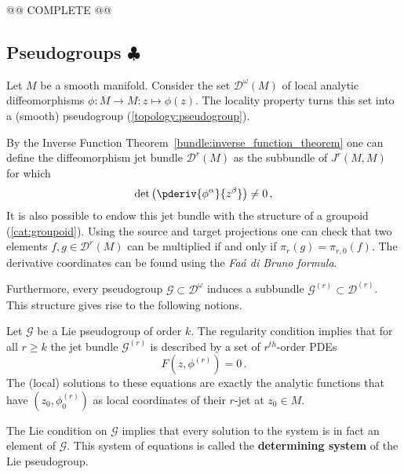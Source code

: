     @@ COMPLETE @@

\subsection{\texorpdfstring{Pseudogroups $\clubsuit$}{Pseudogroups}}

    \begin{example}
        Let $M$ be a smooth manifold. Consider the set $\mathcal{D}^\omega(M)$ of local analytic diffeomorphisms $\phi:M\rightarrow M:z\mapsto\phi(z)$. The locality property turns this set into a (smooth) pseudogroup (\cref{topology:pseudogroup}).

        By the Inverse Function Theorem~\ref{bundle:inverse_function_theorem} one can define the diffeomorphism jet bundle $\mathcal{D}^r(M)$ as the subbundle of $J^r(M,M)$ for which \[\det\left(\pderiv{\phi^\alpha}{z^\beta}\right)\neq0\,.\] It is also possible to endow this jet bundle with the structure of a groupoid (\cref{cat:groupoid}). Using the source and target projections one can check that two elements $f,g\in\mathcal{D}^r(M)$ can be multiplied if and only if $\pi_r(g)=\pi_{r,0}(f)$. The derivative coordinates can be found using the \textit{Fa\'a di Bruno formula}.
    \end{example}
    Furthermore, every pseudogroup $\mathcal{G}\subset\mathcal{D}^\omega$ induces a subbundle $\mathcal{G}^{(r)}\subset\mathcal{D}^{(r)}$. This structure gives rise to the following notions.
    \begin{property}
        Let $\mathcal{G}$ be a Lie pseudogroup of order $k$. The regularity condition implies that for all $r\geq k$ the jet bundle $\mathcal{G}^{(r)}$ is described by a set of $r^{th}$-order PDEs \[F\left(z,\phi^{(r)}\right) = 0\,.\] The (local) solutions to these equations are exactly the analytic functions that have $(z_0,\phi^{(r)}_0)$ as local coordinates of their $r$-jet at $z_0\in M$.

        The Lie condition on $\mathcal{G}$ implies that every solution to the system is in fact an element of $\mathcal{G}$. This system of equations is called the \textbf{determining system} of the Lie pseudogroup.
    \end{property}

